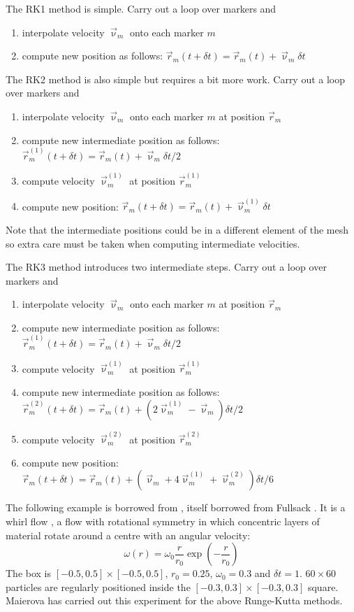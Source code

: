 The RK1 method is simple. Carry out a loop over markers and 
\begin{enumerate}
\item interpolate velocity $\vec\upnu_{m}$ onto each marker $m$
\item compute new position as follows: $\vec r_m(t+\delta t)=\vec r_m(t) + \vec\upnu_m \delta t$
\end{enumerate}

The RK2 method is also simple but requires a bit more work. Carry out a loop over markers and 
\begin{enumerate}
\item interpolate velocity $\vec\upnu_{m}$ onto each marker $m$ at position $\vec r_m$
\item compute new intermediate position as follows: $\vec r_m^{(1)}(t+\delta t)=\vec r_m(t) + \vec\upnu_m \delta t/2$
\item compute velocity $\vec\upnu_{m}^{(1)}$ at position $\vec r_m^{(1)}$
\item compute new position: $\vec r_m(t+\delta t)=\vec r_m(t) + \vec\upnu_m^{(1)} \delta t$ 
\end{enumerate}
Note that the intermediate positions could be in a different element of the mesh so extra care must be taken when 
computing intermediate velocities. 

The RK3 method introduces two intermediate steps. Carry out a loop over markers and 
\begin{enumerate}
\item interpolate velocity $\vec\upnu_{m}$ onto each marker $m$ at position $\vec r_m$
\item compute new intermediate position as follows: $\vec r_m^{(1)}(t+\delta t)=\vec r_m(t) + \vec\upnu_m \delta t/2$
\item compute velocity $\vec\upnu_{m}^{(1)}$ at position $\vec r_m^{(1)}$
\item compute new intermediate position as follows: 
$\vec r_m^{(2)}(t+\delta t)=\vec r_m(t) + (2\vec\upnu_m^{(1)}-\vec\upnu_m) \delta t/2$
\item compute velocity $\vec\upnu_{m}^{(2)}$ at position $\vec r_m^{(2)}$
\item compute new position: 
$\vec r_m(t+\delta t)=\vec r_m(t) + (\vec\upnu_m +4 \vec\upnu_m^{(1)} + \vec\upnu_m^{(2)}    )\delta t/6$ 
\end{enumerate}

The following example is borrowed from \cite{maie12}, itself borrowed from Fullsack \cite[Section 5.4]{full95}.
It is a whirl flow \cite{otti89}, a flow with rotational symmetry in which concentric layers of material
rotate around  a centre with an angular velocity:
\[
\omega(r)= \omega_0 \frac{r}{r_0} \exp\left(-\frac{r}{r_0}  \right)
\]  
The box is $[-0.5,0.5]\times[-0.5,0.5]$, $r_0=0.25$, $\omega_0=0.3$ and $\delta t=1$. 
$60\times 60$ particles are regularly positioned inside the $[-0.3,0.3]\times[-0.3,0.3]$ square.
Maierova \cite{maie12} has carried out this experiment for the above Runge-Kutta methods.

